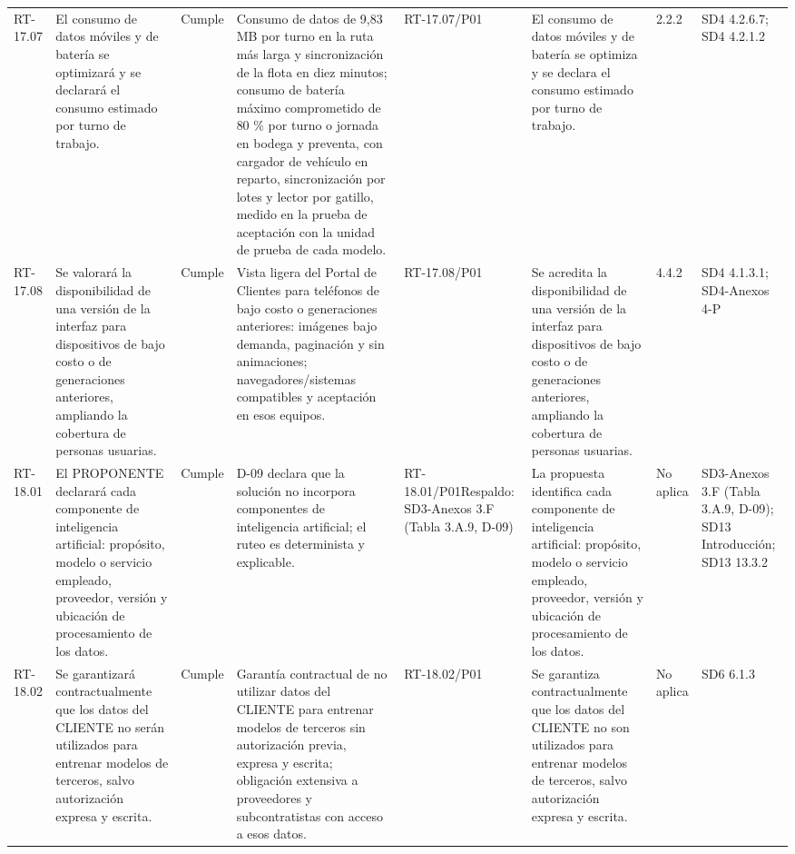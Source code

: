 \documentclass[oficio,firma,final]{lafrox}
\begin{document}
\begin{landscape}
{\begin{longtable}{@{}F{0.054} F{0.173} F{0.061} F{0.191} F{0.106} F{0.180} F{0.067} F{0.168}@{}}
  RT-17.07 & El consumo de datos móviles y de batería se optimizará y se declarará el consumo estimado por turno de trabajo. & Cumple & Consumo de datos de 9,83 MB por turno en la ruta más larga y sincronización de la flota en diez minutos; consumo de batería máximo comprometido de 80 \% por turno o jornada en bodega y preventa, con cargador de vehículo en reparto, sincronización por lotes y lector por gatillo, medido en la prueba de aceptación con la unidad de prueba de cada modelo. & RT-17.07/\allowbreak{}P01 & El consumo de datos móviles y de batería se optimiza y se declara el consumo estimado por turno de trabajo. & 2.2.2 & SD4 4.2.6.7; SD4 4.2.1.2  \\
  RT-17.08 & Se valorará la disponibilidad de una versión de la interfaz para dispositivos de bajo costo o de generaciones anteriores, ampliando la cobertura de personas usuarias. & Cumple & Vista ligera del Portal de Clientes para teléfonos de bajo costo o generaciones anteriores: imágenes bajo demanda, paginación y sin animaciones; navegadores/sistemas compatibles y aceptación en esos equipos. & RT-17.08/\allowbreak{}P01 & Se acredita la disponibilidad de una versión de la interfaz para dispositivos de bajo costo o de generaciones anteriores, ampliando la cobertura de personas usuarias. & 4.4.2 & SD4 4.1.3.1; SD4-Anexos 4-P  \\
  RT-18.01 & El PROPONENTE declarará cada componente de inteligencia artificial: propósito, modelo o servicio empleado, proveedor, versión y ubicación de procesamiento de los datos. & Cumple & D-09 declara que la solución no incorpora componentes de inteligencia artificial; el ruteo es determinista y explicable. & RT-18.01/\allowbreak{}P01\newline Respaldo: SD3-Anexos 3.F (Tabla 3.A.9, D-09) & La propuesta identifica cada componente de inteligencia artificial: propósito, modelo o servicio empleado, proveedor, versión y ubicación de procesamiento de los datos. & No aplica & SD3-Anexos 3.F (Tabla 3.A.9, D-09); SD13 Introducción; SD13 13.3.2  \\
  RT-18.02 & Se garantizará contractualmente que los datos del CLIENTE no serán utilizados para entrenar modelos de terceros, salvo autorización expresa y escrita. & Cumple & Garantía contractual de no utilizar datos del CLIENTE para entrenar modelos de terceros sin autorización previa, expresa y escrita; obligación extensiva a proveedores y subcontratistas con acceso a esos datos. & RT-18.02/\allowbreak{}P01 & Se garantiza contractualmente que los datos del CLIENTE no son utilizados para entrenar modelos de terceros, salvo autorización expresa y escrita. & No aplica & SD6 6.1.3  \\

\end{longtable}}
\end{landscape}
\end{document}
